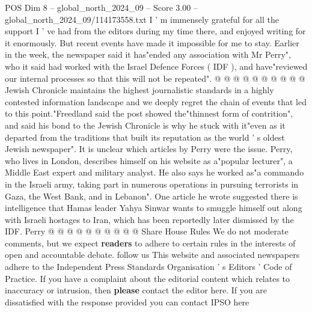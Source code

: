 \begin{textsample}{POS Dim 8 – global\_north\_2024\_09 – Score 3.00 – global\_north\_2024\_09/114173558.txt}
I ' m immensely grateful for all the support I ' ve had from the editors during my time there, and enjoyed writing for it enormously.
But recent events have made it impossible for me to stay.
Earlier in the week, the newspaper said it has"ended any association with Mr Perry", who it said had worked with the Israel Defence Forces ( IDF ), and have"reviewed our internal processes so that this will not be repeated". @ @ @ @ @ @ @ @ @ @ Jewish Chronicle maintains the highest journalistic standards in a highly contested information landscape and we deeply regret the chain of events that led to this point."Freedland said the post showed the"thinnest form of contrition", and said his bond to the Jewish Chronicle is why he stuck with it"even as it departed from the traditions that built its reputation as the world ' s oldest Jewish newspaper".
It is unclear which articles by Perry were the issue.
Perry, who lives in London, describes himself on his website as a"popular lecturer", a Middle East expert and military analyst.
He also says he worked as"a commando in the Israeli army, taking part in numerous operations in pursuing terrorists in Gaza, the West Bank, and in Lebanon".
One article he wrote suggested there is intelligence that Hamas leader Yahya Sinwar wants to smuggle himself out along with Israeli hostages to Iran, which has been reportedly later dismissed by the IDF.
Perry @ @ @ @ @ @ @ @ @ @ Share House Rules We do not moderate comments, but we expect \textbf{readers} to adhere to certain rules in the interests of open and accountable debate. follow us This website and associated newspapers adhere to the Independent Press Standards Organisation ' s Editors ' Code of Practice.
If you have a complaint about the editorial content which relates to inaccuracy or intrusion, then \textbf{please} contact the editor here.
If you are dissatisfied with the response provided you can contact IPSO here

\end{textsample}
